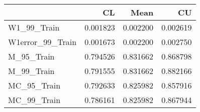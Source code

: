 \begin{tabular}{lrrr}
\toprule
{} &        CL &      Mean &        CU \\
\midrule
W1\_99\_Train      &  0.001823 &  0.002200 &  0.002619 \\
W1error\_99\_Train &  0.001673 &  0.002200 &  0.002750 \\
M\_95\_Train       &  0.794526 &  0.831662 &  0.868798 \\
M\_99\_Train       &  0.791555 &  0.831662 &  0.882166 \\
MC\_95\_Train      &  0.792633 &  0.825982 &  0.857916 \\
MC\_99\_Train      &  0.786161 &  0.825982 &  0.867944 \\
\bottomrule
\end{tabular}
